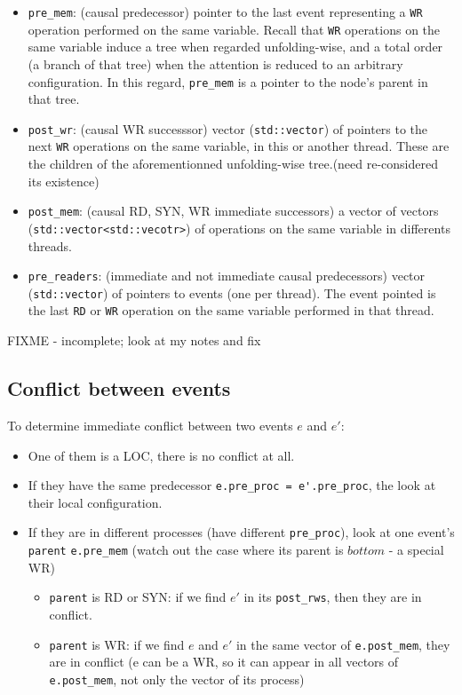 \documentclass{llncs}
\begin{document}
\begin{itemize}
\item
  \verb!pre_mem!: (causal predecessor) pointer to the last event
  representing a \verb!WR! operation performed on the same variable.
  Recall that \verb!WR! operations on the same variable induce a tree when
  regarded unfolding-wise, and a total order (a branch of that tree) when
  the attention is reduced to an arbitrary configuration.
  In this regard, \verb!pre_mem! is a pointer to the node's parent in that
  tree.
\item
	
  \verb!post_wr!: (causal WR successsor) vector (\verb!std::vector!) of
  pointers to the next \verb!WR! operations on the same variable, in this
  or another thread. These are the children of the aforementionned
  unfolding-wise tree.(need re-considered its existence)
\item
  \verb!post_mem!: (causal RD, SYN, WR immediate successors) a vector of vectors (\verb!std::vector<std::vecotr>!) of operations on the same variable in differents threads. 
	
\item
  \verb!pre_readers!: (immediate and not immediate causal predecessors)
  vector (\verb!std::vector!) of pointers to events (one per thread).
  The event pointed is the last \verb!RD! or \verb!WR! operation on the
  same variable performed in that thread.
\end{itemize}

FIXME - incomplete; look at my notes and fix


\subsection{Conflict between events}
To determine immediate conflict between two events $e$ and $e'$: 
\begin{itemize}
	\item
		One of them is a LOC, there is no conflict at all.
	\item
		If they have the same predecessor \verb!e.pre_proc = e'.pre_proc!, the look at their local configuration.
	\item
		If they are in different processes (have different \verb!pre_proc!), look at one event's \verb!parent! \verb!e.pre_mem! (watch out the case where its parent is $bottom$ - a special WR)
	\begin{itemize}
		\item
			\verb!parent! is RD or SYN: if we find $e'$ in its \verb!post_rws!, then they are in
			 conflict.
		\item
			\verb!parent! is WR: if we find $e$ and $e'$ in the same vector of \verb!e.post_mem!,
			 they are in conflict (e can be a WR, so it can appear in all vectors of 
			 \verb!e.post_mem!, not only the vector of its process)
	\end{itemize}
		
\end{itemize}
\end{document}
